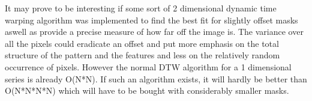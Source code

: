 It may prove to be interesting if some sort of 2 dimensional dynamic time warping algorithm was implemented to find the best fit for slightly offset masks aswell as provide a precise measure of how far off the image is. The variance over all the pixels could eradicate an offset and put more emphasis on the total structure of the pattern and the features and less on the relatively random occurrence of pixels. However the normal DTW algorithm for a 1 dimensional series is already O(N*N). If such an algorithm exists, it will hardly be better than O(N*N*N*N) which will have to be bought with considerably smaller masks.



